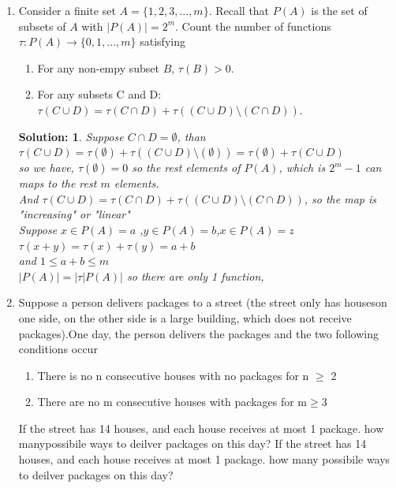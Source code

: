 \documentclass{article}
\theoremstyle{break}
\newtheorem*{solution*}{\textbf{Solution:} }
\begin{document}
\begin{enumerate}
\begin{proof}
\begin{figure}[H]
        \end{figure}
        By the pigeonhole theorem, at least 1 block can have more than $\lfloor \frac{28}{9} +1  \rfloor = 4 $ points.\\
        For the biggest block, the distance between two points can't be larger than 2.\\
        so, there is a collection of 4 points such that thedistance between any two in the collection is at most 2.
\end{proof}
\vspace{10mm}
\item Consider  a  finite  set $A=\{1,2,3,...,m\}$.   Recall  that $P(A)$  is  the  set of  subsets  of $A$ with $|P(A)|=  2^m$.   Count  the  number  of  functions $\tau: P(A)\rightarrow \{0,1,...,m\}$ satisfying
\begin{enumerate}
        \item For any non-empy subset $B$, $\tau(B)>0$.
        \item  For any subsets C and D: $\tau (C \cup D) = \tau(C\cap D) +\tau ((C\cup D) \setminus (C\cap D)).$
\end{enumerate}
\begin{solution*}
        Suppose $C \cap D = \emptyset $, than $\tau (C \cup D) = \tau(\emptyset) +\tau ((C\cup D) \setminus (\emptyset)) = \tau(\emptyset)  + \tau (C\cup D)$\\
        so we have, $\tau(\emptyset) = 0$
        so the rest elements of $P(A)$, which is $2^m - 1$ can maps to the rest $m$ elements.\\
        And $\tau (C \cup D) = \tau(C\cap D) +\tau ((C\cup D) \setminus (C\cap D))$, so the map is "increasing" or "linear"\\
       Suppose $x \in P(A) = a$ ,$y \in P(A) = b$,$x \in P(A) = z$
       $\tau (x + y) = \tau(x) + \tau(y) = a + b$\\
       and $1 \leq a+b \leq m$\\
       $|P(A)| = |\tau|P(A)|$
        so there are only 1 function,\\
\end{solution*}
\newpage
\item Suppose a person delivers packages to a street (the street only has houseson one side,  on the other side is a large building,  which does not receive packages).One day, the person delivers the packages and the two following conditions occur
\begin{enumerate}
        \item There is no n consecutive houses with no packages for n $\geq$ 2
        \item There are no m consecutive houses with packages for m$\geq$3
\end{enumerate}If  the  street  has  14  houses,  and  each  house  receives  at  most  1  package.   how  manypossibile ways to deilver packages on this day?
If  the  street  has  14  houses,  and  each  house  receives  at  most  1  package.   how  many possibile ways to deilver packages on this day?
\end{enumerate}
\end{document}
